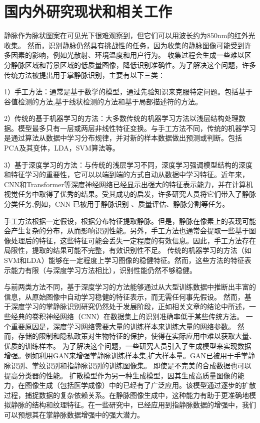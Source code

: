 \section{国内外研究现状和相关工作}
\label{sec:related_work}

静脉作为脉状图案在可见光下很难观察到，但它们可以用波长约为850nm的红外光收集。
然而，识别静脉仍然具有挑战性的任务，因为收集的静脉图像可能受到许多因素的影响，例如光散射\cite{yang2014towards}、环境温度\cite{kumar2011human}和用户行为\cite{miura2007extraction}。
收集过程会生成一些难以区分静脉区域和背景区域的低质量图像，降低识别准确性。为了解决这个问题，许多传统方法被提出用于掌静脉识别，主要有以下三类：

1）手工方法：通常是基于数学的模型，通过先验知识来克服特定问题\cite{nanni2017handcrafted}。包括基于谷值检测的方法\cite{zhou2011human}\cite{miura2007extraction},基于线状检测的方法\cite{kumar2011human}和基于局部描述符的方法\cite{kang2014contactless}。

2）传统的基于机器学习的方法：大多数传统的机器学习方法以浅层结构处理数据\cite{wang2021comparative}。模型最多只有一层或两层非线性特征变换。与手工方法不同，传统的机器学习是通过算法从数据中学习分布规律，并对新的样本数据做出预测或判断。包括PCA及其变体，LDA，SVM算法等。

3）基于深度学习的方法：与传统的浅层学习不同，深度学习强调模型结构的深度和特征学习的重要性，它可以以端到端的方式自动从数据中学习特征\cite{wang2021comparative}。近年来，CNN和Transformer等深度神经网络已经显示出强大的特征表示能力，并在计算机视觉任务中取得了优秀的结果。受其成功的启发，许多研究人员将它们带入了静脉分类任务\cite{itqan2016user},例如，CNN 已被用于静脉识别 \cite{itqan2016user}、质量评估\cite{qin2017deep}、静脉分割\cite{qin2017deep}等任务。

手工方法根据一定假设，根据分布特征提取静脉。但是，静脉在像素上的表现可能会产生复杂的分布，从而影响识别性能。另外，手工方法也通常会提取一些基于图像处理后的特征，这些特征可能会丢失一定程度的有效信息。因此，手工方法存在局限性，提取的结果可能不完整，有效识别性不足。
传统的机器学习的方法（如SVM和LDA）能够在一定程度上学习图像的稳健特征。然而，这些方法的特征表示能力有限（与深度学习方法相比），识别性能仍然不够稳健。

与前两类方法不同，基于深度学习的方法能够通过从大型训练数据中推断出丰富的信息，从原始图像中自动学习稳健的特征表示，而无需任何事先假设。
然而，基于深度学习的掌静脉识别研究仍然处于发展阶段，正如相关文章\cite{jia2021performance}的结论中所述，一些经典的卷积神经网络（CNN）在数据集上的识别准确率低于某些传统方法。
一个重要原因是，深度学习网络需要大量的训练样本来训练大量的网络参数。
然而，存储的限制和隐私政策对生物特征的保护，使得在实际应用中难以获取大量、优质的训练样本。
为了解决这个问题，一些研究人员引入了生成模型来实现数据增强。例如利用GAN来增强掌静脉训练样本集\cite{ou2022gan},扩大样本量。GAN已被用于手掌静脉识别\cite{ou2022gan}、掌纹识别\cite{wang2018generative}和指静脉识别\cite{zhang2019gan}的训练图像集。
即使是不完美的合成数据也可以提高分类器的性能。
扩散模型作为另一种生成模型，因其生成高质量图像的能力，在图像生成（包括医学成像）中的已经有了广泛应用\cite{zhang2023survey}。该模型通过逐步的扩散过程，捕捉数据的复杂依赖关系。在静脉图像生成中，这种能力有助于更准确地模拟静脉的结构和纹理特征。在一些研究中，已经应用到指静脉数据的增强中\cite{liu2024diffvein}，我们可以预想其在掌静脉数据增强中的强大潜力。


